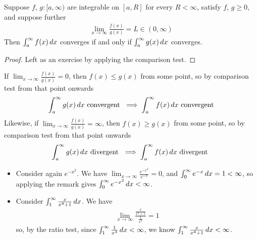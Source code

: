 \documentclass{../template/note}
\begin{document}
    \begin{proposition}
        Suppose \(f\), \(g: [a, \infty)\) are integrable on \([a, R]\) for every \(R < \infty\), satisfy \(f\), \(g \geq 0\), and suppose further
        \begin{align*}
            \lim_{x \to \infty} \frac{f(x)}{g(x)} = L \in (0, \infty)
        \end{align*}
        Then \(\int_a^\infty f(x) \,d{x}\) converges if and only if \(\int_a^\infty g(x) \,d{x}\) converges.
    \end{proposition}
    
    \begin{proof}
        Left as an exercise by applying the comparison test.
    \end{proof}
    
    \begin{remark*}
        If \(\lim_{x \to \infty} \frac{f(x)}{g(x)} = 0\), then \(f(x) \leq g(x)\) from some point, so by comparison test from that point onwards
        \begin{align*}
            \int_a^\infty g(x) \,d{x} \text{ convergent } \implies \int_a^\infty f(x) \,d{x} \text{ convergent} 
        \end{align*}
        Likewise, if \(\lim_{x \to \infty} \frac{f(x)}{g(x)} = \infty\), then \(f(x) \geq g(x)\) from some point, so by comparison test from that point onwards
        \begin{align*}
            \int_a^\infty g(x) \,d{x} \text{ divergent } \implies \int_a^\infty f(x) \,d{x} \text{ divergent }
        \end{align*}
    \end{remark*}
    
    \begin{example*}
        \begin{itemize}
            \item Consider again \(e^{-x^2}\). We have \(\lim_{x \to \infty} \frac{e^{-x^2}}{e^{-x}} = 0\), and \(\int_0^\infty e^{-x} \,d{x} = 1 < \infty\), so applying the remark gives \(\int_0^\infty e^{-x^2} \,d{x} < \infty\).
            \item Consider \(\int_1^\infty \frac x{x^4+1} \,d{x}\). We have
            \begin{align*}
                \lim_{x \to \infty} \frac{\frac{x}{x^4+1}}{\frac 1 {x^3}} = 1
            \end{align*}
            so, by the ratio test, since \(\int_1^\infty \frac 1 {x^3} \,d{x} < \infty\), we know \(\int_1^\infty \frac{x}{x^4+1} \,d{x} < \infty\).
        \end{itemize}
    \end{example*}
    
\end{document}
